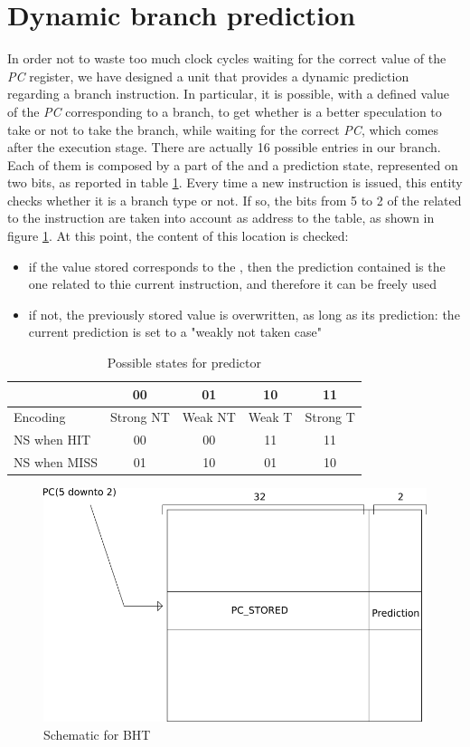 \section{Dynamic branch prediction}
\label{dyn_br}
In order not to waste too much clock cycles waiting for the correct value of the \textit{PC} register, we have designed a unit that provides a dynamic prediction regarding a branch instruction. In particular, it is possible, with a defined value of the \textit{PC} corresponding to a branch, to get whether is a better speculation to take or not to take the branch, while waiting for the correct \textit{PC}, which comes after the execution stage. 
There are actually 16 possible entries in our branch. Each of them is composed 
by a part of the \pc and a prediction state, represented on two bits, as 
reported in table \ref{pred_tab}. Every time a new instruction is issued, this 
entity checks whether it is a branch type or not. If so, the bits from 5 to 2 
of the \pc related to the instruction are taken into account as address to the 
table, as shown in figure \ref{bht_fig}. At this point, the content of this 
location is checked:
\begin{itemize}
	\item if the value stored corresponds to the \pc, then the prediction contained is the one related to thie current instruction, and therefore it can be freely used
	\item if not, the previously stored value is overwritten, as long as its prediction: the current prediction is set to a "weakly not taken case"
\end{itemize}

\begin{table}[]
	\centering
	\begin{tabular}{l|cccc}
		\toprule
		& 00        & 01      & 10     & 11       \\
		\toprule
		Encoding     & Strong NT & Weak NT & Weak T & Strong T \\
		\midrule
		NS when HIT  & 00        & 00      & 11     & 11       \\
		NS when MISS & 01        & 10      & 01     & 10      	\\
		\bottomrule
	\end{tabular}
\caption{Possible states for predictor}
\label{pred_tab}
\end{table}


\begin{figure}
	\centering
	\includegraphics[scale=0.5]{chapters/figures/bht}
	\caption{Schematic for BHT}
	\label{bht_fig}
\end{figure}